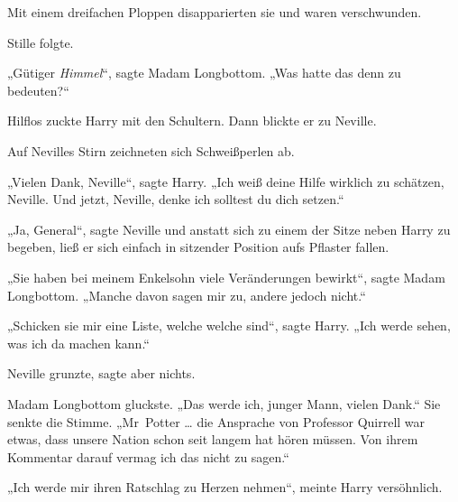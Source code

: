 Mit einem dreifachen Ploppen disapparierten sie und waren verschwunden.

Stille folgte.

„Gütiger \emph{Himmel}“, sagte Madam Longbottom.
„Was hatte das denn zu bedeuten?“

Hilflos zuckte Harry mit den Schultern. Dann blickte er zu Neville.

Auf Nevilles Stirn zeichneten sich Schweißperlen ab.

„Vielen Dank, Neville“, sagte Harry.
„Ich weiß deine Hilfe wirklich zu schätzen, Neville. Und jetzt, Neville, denke ich solltest du dich setzen.“

„Ja, General“, sagte Neville und anstatt sich zu einem der Sitze neben Harry zu begeben, ließ er sich einfach in sitzender Position aufs Pflaster fallen.

„Sie haben bei meinem Enkelsohn viele Veränderungen bewirkt“, sagte Madam Longbottom.
„Manche davon sagen mir zu, andere jedoch nicht.“

„Schicken sie mir eine Liste, welche welche sind“, sagte Harry.
„Ich werde sehen, was ich da machen kann.“

Neville grunzte, sagte aber nichts.

Madam Longbottom gluckste.
„Das werde ich, junger Mann, vielen Dank.“ Sie senkte die Stimme.
„Mr~Potter … die Ansprache von Professor Quirrell war etwas, dass unsere Nation schon seit langem hat hören müssen. Von ihrem Kommentar darauf vermag ich das nicht zu sagen.“

„Ich werde mir ihren Ratschlag zu Herzen nehmen“, meinte Harry versöhnlich.

